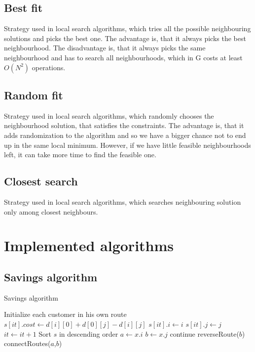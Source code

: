 \documentclass[thesis=B,english]{FITthesis}[2012/10/20]
\begin{document}
        \subsection{Best fit}
            Strategy used in local search algorithms, which tries all the possible neighbouring solutions and picks the best one. The advantage is, that it always picks the best neighbourhood. The disadvantage is, that it always picks the same neighbourhood and has to search all neighbourhoods, which in G costs at least \(O(N^2)\) operations.
        \subsection{Random fit}
            Strategy used in local search algorithms, which randomly chooses the neighbourhood solution, that satisfies the constraints. The advantage is, that it adds randomization to the algorithm and so we have a bigger chance not to end up in the same local minimum. However, if we have little feasible neighbourhoods left, it can take more time to find the feasible one.
        \subsection{Closest search}
            Strategy used in local search algorithms, which searches neighbouring solution only among closest neighbours.
\newpage
    \section{Implemented algorithms}
\newpage
        \subsection{Savings algorithm\cite{5}}
\begin{algorithm}
\caption{Savings algorithm}\label{savings}
\begin{algorithmic}[1]
\State Initialize each customer in his own route
        \State $s[it].cost \gets d[i][0] + d[0][j] - d[i][j]$
        \State $s[it].i \gets i$
        \State $s[it].j \gets j$
        \State $it \gets it + 1$
    \EndFor
\EndFor
\State Sort $s$ in descending order
    \State $a \gets x.i$
    \State $b \gets x.j$
        \State continue
    \EndIf
        \State reverseRoute($b$)
    \EndIf
        \State connectRoutes($a$,$b$)
    \EndIf
\EndFor
\EndProcedure
\end{algorithmic}
\end{algorithm}
\newpage
\end{document}
